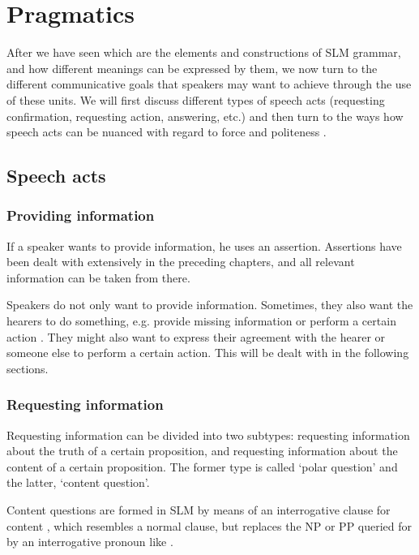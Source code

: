 \chapter{Pragmatics}\label{sec:Pragmatics}
After we have seen which are the elements and constructions of SLM grammar, and how different meanings can be expressed by them, we now turn to the different communicative goals that speakers may want to achieve through the use of these units. We will first discuss different types of speech acts (requesting confirmation, requesting action, answering, etc.)  and then turn to the ways how speech acts can be nuanced with regard to force and politeness .

\section{Speech acts}\label{sec:pragm:Speechacts}


\subsection{Providing information}\label{sec:pragm:Providinginformation}
If a speaker wants to provide information, he uses an assertion.
Assertions have been dealt with extensively in the preceding chapters, and all relevant information can be taken from there.

Speakers do not only want to provide information. Sometimes, they also want the hearers to do something, e.g. provide missing information or perform a certain action \citep[319]{Givon2001b}. They might also want to express their agreement with the hearer or someone else to perform a certain action. This will be dealt with in the following sections.

\subsection{Requesting information}\label{sec:pragm:Requestinginformation}
Requesting information can be divided into two subtypes: requesting information about the truth of a certain proposition, and requesting information about the content of a certain proposition. The former type is called `polar question' and the latter, `content question'.

Content questions are formed in SLM by means of an interrogative clause for content , which resembles a normal clause, but replaces the NP or PP queried for by an interrogative pronoun like .  

